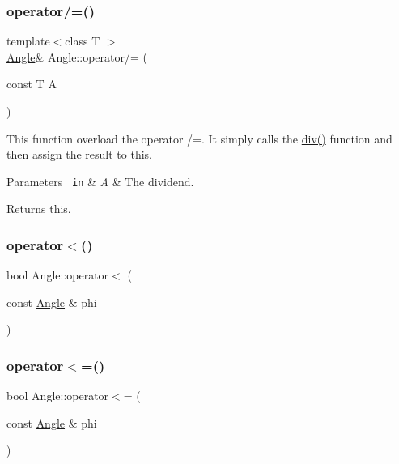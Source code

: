 \subsubsection{\texorpdfstring{operator/=()}{operator/=()}}
{\footnotesize\ttfamily template$<$class T $>$ \\
\mbox{\hyperlink{class_angle}{Angle}}\& Angle\+::operator/= (\begin{DoxyParamCaption}\item[{const T}]{A }\end{DoxyParamCaption})\hspace{0.3cm}{\ttfamily [inline]}}

This function overload the operator /=. It simply calls the {\ttfamily \mbox{\hyperlink{class_angle_accc4f9c0df6965dc1fecab234d30b348}{div()}}} function and then assign the result to this. 
\begin{DoxyParams}[1]{Parameters}
\mbox{\texttt{ in}}  & {\em A} & The dividend. \\
\hline
\end{DoxyParams}
\begin{DoxyReturn}{Returns}
{\ttfamily this}. 
\end{DoxyReturn}
\mbox{\label{class_angle_a6771d6e2005dcb8ddb6355349441dc38}} 
\subsubsection{\texorpdfstring{operator$<$()}{operator<()}}
{\footnotesize\ttfamily bool Angle\+::operator$<$ (\begin{DoxyParamCaption}\item[{const \mbox{\hyperlink{class_angle}{Angle}} \&}]{phi }\end{DoxyParamCaption})\hspace{0.3cm}{\ttfamily [inline]}}

\mbox{\label{class_angle_ad18dd2a58b59f2b8d57431cf122f026c}} 
\subsubsection{\texorpdfstring{operator$<$=()}{operator<=()}}
{\footnotesize\ttfamily bool Angle\+::operator$<$= (\begin{DoxyParamCaption}\item[{const \mbox{\hyperlink{class_angle}{Angle}} \&}]{phi }\end{DoxyParamCaption})\hspace{0.3cm}{\ttfamily [inline]}}

